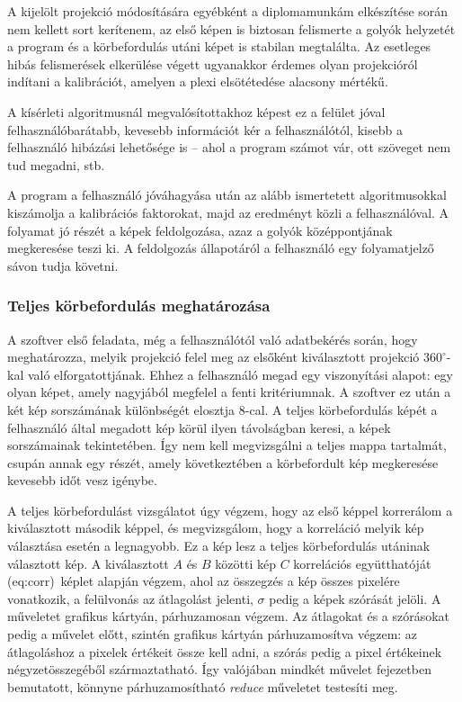 \documentclass[a4paper,12pt]{article}
\begin{document}
A kijelölt projekció módosítására egyébként a diplomamunkám elkészítése során nem kellett sort kerítenem, az első képen is biztosan felismerte a golyók helyzetét a program és a körbefordulás utáni képet is stabilan megtalálta. Az esetleges hibás felismerések elkerülése végett ugyanakkor érdemes olyan projekcióról indítani a kalibrációt, amelyen a plexi elsötétedése alacsony mértékű.


A kísérleti algoritmusnál megvalósítottakhoz  képest ez a felület jóval felhasználóbarátabb, kevesebb információt kér a felhasználótól, kisebb a felhasználó hibázási lehetősége is -- ahol a program számot vár, ott szöveget nem tud megadni, stb.

A program a felhasználó jóváhagyása után az alább ismertetett algoritmusokkal kiszámolja a kalibrációs faktorokat, majd az eredményt közli a felhasználóval. A folyamat  jó részét a képek feldolgozása, azaz a golyók középpontjának megkeresése teszi ki. A feldolgozás állapotáról a felhasználó egy folyamatjelző sávon tudja követni.






\subsubsection{Teljes körbefordulás meghatározása}

A szoftver első feladata, még a felhasználótól való adatbekérés során, hogy meghatározza, melyik projekció felel meg az elsőként kiválasztott projekció $360^\circ$-kal való elforgatottjának. Ehhez a felhasználó megad egy viszonyítási alapot: egy olyan képet, amely nagyjából megfelel a fenti kritériumnak. A szoftver ez után a két kép sorszámának különbségét elosztja $8$-cal. A teljes körbefordulás képét a felhasználó által megadott kép körül ilyen távolságban keresi, a képek sorszámainak tekintetében. Így nem kell megvizsgálni a teljes mappa tartalmát, csupán annak egy részét, amely következtében a körbefordult kép megkeresése kevesebb időt vesz igénybe. 


A teljes körbefordulást vizsgálatot úgy végzem, hogy az első képpel korrerálom a kiválasztott második képpel, és megvizsgálom, hogy a korreláció melyik kép választása esetén a legnagyobb. Ez a kép lesz a teljes körbefordulás utáninak választott kép. A kiválasztott $A$ és $B$ közötti kép $C$ korrelációs együtthatóját \aref({eq:corr})~képlet alapján végzem, ahol az összegzés a kép összes pixelére vonatkozik, a felülvonás az átlagolást jelenti, $\sigma$ pedig a képek szórását jelöli. A műveletet grafikus kártyán, párhuzamosan végzem. Az átlagokat és a szórásokat pedig a művelet előtt, szintén grafikus kártyán párhuzamosítva végzem: az átlagoláshoz a pixelek értékeit össze kell adni, a szórás pedig a pixel értékeinek négyzetösszegéből származtatható. Így valójában mindkét művelet  fejezetben bemutatott, könnyne párhuzamosítható \emph{reduce} műveletet testesíti meg.
\end{document}
